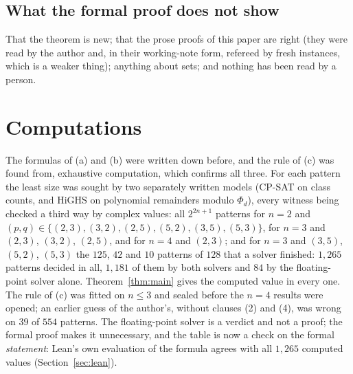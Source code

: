 \documentclass[11pt,a4paper]{amsart}
\theoremstyle{definition}
\theoremstyle{remark}
\begin{document}
\subsection*{What the formal proof does not show} That the theorem is new; that the prose proofs of this
paper are right (they were read by the author and, in their working-note form, refereed by fresh instances,
which is a weaker thing); anything about sets; and nothing has been read by a person.


\section{Computations}\label{sec:computations}

The formulas of (a) and (b) were written down before, and the rule of (c) was found from, exhaustive
computation, which confirms all three. For each pattern the least size was sought by two separately written models (CP-SAT on class counts,
and HiGHS on polynomial remainders modulo $\Phi_d$), every witness being checked a third way by complex
values: all $2^{2n+1}$ patterns for $n=2$ and $(p,q)\in\{(2,3),(3,2),(2,5),(5,2),(3,5),(5,3)\}$, for
$n=3$ and $(2,3)$, $(3,2)$, $(2,5)$, and for $n=4$ and $(2,3)$; and for $n=3$ and $(3,5)$, $(5,2)$,
$(5,3)$ the $125$, $42$ and $10$ patterns of $128$ that a solver finished: $1{,}265$ patterns decided
in all, $1{,}181$ of them by both solvers and $84$ by the floating-point solver alone. Theorem~\ref{thm:main} gives the computed value in every
one. The rule of (c) was fitted on $n\le3$ and sealed before the $n=4$ results were opened; an earlier guess
of the author's, without clauses (2) and (4), was wrong on $39$ of $554$ patterns. The floating-point solver
is a verdict and not a proof; the formal proof makes it unnecessary, and the table is now a check on the
formal \emph{statement}: Lean's own evaluation of the formula agrees with all $1{,}265$ computed values
(Section~\ref{sec:lean}).
\end{document}
